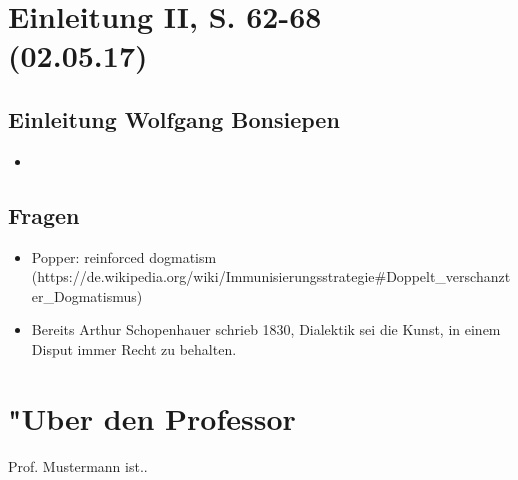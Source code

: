 \documentclass[emulatestandardclasses]{scrartcl}
\begin{document}
\section{Einleitung II, S. 62-68\\(02.05.17)}

\subsection{Einleitung Wolfgang Bonsiepen}

\begin{itemize}
  \item 
\end{itemize}

\subsection{Fragen}

\begin{itemize}
  \item Popper: reinforced dogmatism (https://de.wikipedia.org/wiki/Immunisierungsstrategie#Doppelt_verschanzter_Dogmatismus)
  \item Bereits Arthur Schopenhauer schrieb 1830, Dialektik sei die Kunst, in einem Disput immer Recht zu behalten.
\end{itemize}

\newpage
\section{"Uber den Professor}
Prof. Mustermann ist..


\end{document}
